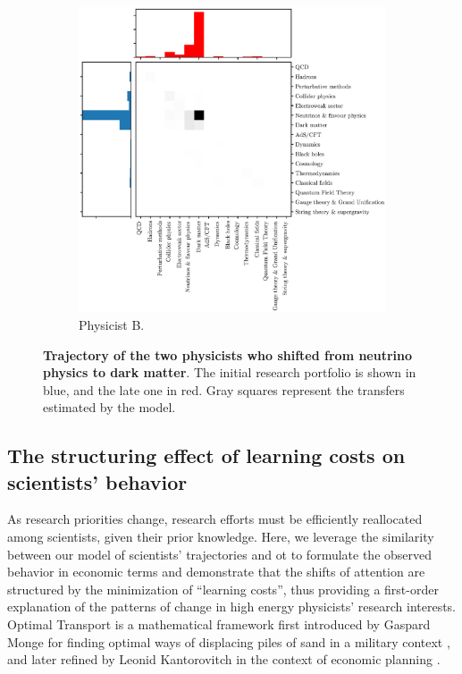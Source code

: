 \documentclass{article}
\begin{document}
\begin{figure}[h]
\begin{subfigure}{0.45\textwidth}
    \includegraphics[width=1.15\textwidth]{Fig4b.eps}
    \caption{Physicist B. %
    }
    \label{fig:J.F.Beacom.1}
\end{subfigure}
\caption{\textbf{Trajectory of the two physicists who shifted from neutrino physics to dark matter}. The initial research portfolio is shown in blue, and the late one in red. Gray squares represent the transfers estimated by the model.}
\label{fig:turns_neutrinos_dm}
\end{figure}

\subsection{\label{sec:optimal-transport}The structuring effect of learning costs on scientists' behavior}

As research priorities change, research efforts must be efficiently reallocated among scientists, given their prior knowledge. Here, we leverage the similarity between our model of scientists' trajectories and \gls{ot} \citep{muzellec2017tsallis,li2019learning} to formulate the observed behavior in economic terms and demonstrate that the shifts of attention are structured by the minimization of ``learning costs'', thus providing a first-order explanation of the patterns of change in high energy physicists' research interests. Optimal Transport is a mathematical framework first introduced by Gaspard Monge for finding optimal ways of displacing piles of sand in a military context \citep{monge1781memoire}, and later refined by Leonid Kantorovitch in the context of economic planning \citep{kantorovich2006translocation}.
\end{document}
